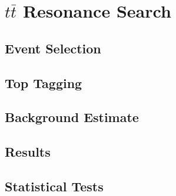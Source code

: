 \chapter{$t\bar{t}$ Resonance Search}
\label{chap:conclusion}


\section{Event Selection}

\section{Top Tagging}

\section{Background Estimate}

\section{Results}

\section{Statistical Tests}

